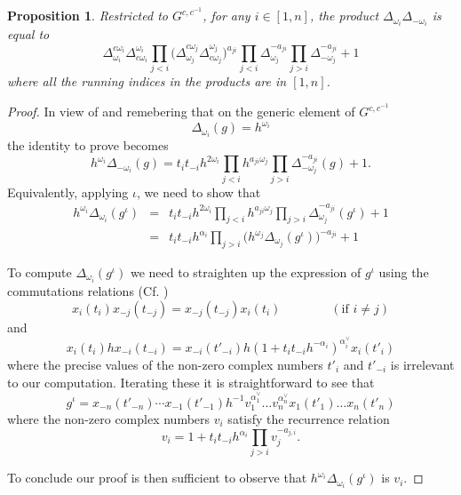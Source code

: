 \documentclass[12pt]{amsart}
\newtheorem{proposition}[theorem]{Proposition}
\numberwithin{equation}{section}
\begin{document}
\begin{proposition}
  Restricted to $G^{c,c^{-1}}$, for any $i\in[1,n]$, the product $\Delta_{\omega_i}\Delta_{-\omega_i}$ is equal to
  \begin{equation} 
    \Delta^{c \omega_i}_{\omega_i}
    \Delta^{\omega_i}_{ c\omega_i} 
    \prod_{j<i}\big(
      \Delta^{c \omega_j}_{\omega_j} 
      \Delta^{\omega_j}_{c \omega_j}
    \big)^{a_{j i}}
    \prod_{j<i}\Delta_{\omega_j}^{-a_{ji}}
    \prod_{j>i}\Delta_{-\omega_j}^{-a_{ji}}
    +1
  \end{equation}
  where all the running indices in the products are in $[1,n]$.
\end{proposition}
\begin{proof}
  In view of  and remebering that on the generic element  of $G^{c,c^{-1}}$ 
  \[
    \Delta_{\omega_i}(g) = h^{\omega_i}
  \]
  the identity to prove becomes
  \[
    h^{\omega_i}\Delta_{-\omega_i}(g)
    =
    t_i
    t_{-i}
    h^{2\omega_i}
    \prod_{j<i}h^{a_{j i}\omega_j}
    \prod_{j>i}\Delta_{-\omega_j}^{-a_{ji}}(g)
    +
    1.
  \]
  Equivalently, applying $\iota$, we need to show that 
  \begin{eqnarray*}
    h^{\omega_i}\Delta_{\omega_i}(g^\iota)
    & = &
    t_i
    t_{-i}
    h^{2\omega_i}
    \prod_{j<i}h^{a_{ji}\omega_j}
    \prod_{j>i}\Delta_{\omega_j}^{-a_{ji}}(g^\iota)
    +
    1\\
    & = &
    t_i
    t_{-i}
    h^{\alpha_i}
    \prod_{j>i}\Big(h^{\omega_j}\Delta_{\omega_j}(g^\iota)\Big)^{-a_{ji}}
    +
    1
  \end{eqnarray*}

  To compute $\Delta_{\omega_i}(g^\iota)$ we need to straighten up the expression of $g^\iota$ using the commutations relations (Cf. \cite[Proposition 7.2]{BZ01})
  \begin{equation}
    x_i(t_i)x_{-j}(t_{-j}) 
    =
    x_{-j}(t_{-j})x_i(t_i) 
    \qquad
    \qquad
    (\text{if $i\neq j$})
  \end{equation}
  and
  \begin{equation}
    x_i(t_i) h x_{-i}(t_{-i})
    =
    x_{-i}(t'_{-i})
    h
    (1+t_it_{-i}h^{-\alpha_i})^{\alpha_i^\vee}
    x_{i}(t'_i)
  \end{equation}
  where the precise values of the non-zero complex numbers $t'_i$ and $t'_{-i}$ is irrelevant to our computation.
  Iterating these it is straightforward to see that
  \[
    g^\iota 
    = 
    x_{-n}(t'_{-n})
    \cdots
    x_{-1}(t'_{-1})
    h^{-1}
    v_1^{\alpha^\vee_1}
    \dots
    v_n^{\alpha^\vee_n}
    x_1(t'_1)
    \dots
    x_n(t'_n)
  \]
  where the non-zero complex numbers $v_i$ satisfy the recurrence relation
  \[
    v_i 
    = 
    1 + t_i t_{-i} h^{\alpha_i}
    \prod_{j > i} v_j^{-a_{j,i}}.
  \]

  To conclude our proof is then sufficient to observe that $h^{\omega_i}\Delta_{\omega_i}(g^\iota)$ is $v_i$.

\end{proof}
\end{document}
